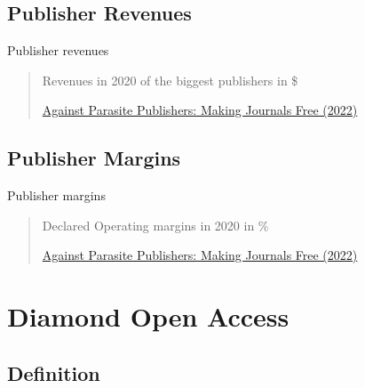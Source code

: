 \documentclass[10pt,compress,serif,aspectratio=169]{beamer}
\begin{document}

\subsection{Publisher Revenues}
\begin{frame}[t]{Publisher revenues}
 \begin{quote}
   Revenues in 2020 of the biggest publishers in \$

   \href{https://doi.org/10.5281/zenodo.7212922}{Against Parasite Publishers: Making Journals Free (2022)}

 \end{quote}
\end{frame}

\subsection{Publisher Margins}
\begin{frame}[t]{Publisher margins}
 \begin{quote}

   Declared Operating margins in 2020 in \%

   \href{https://doi.org/10.5281/zenodo.7212922}{Against Parasite Publishers: Making Journals Free (2022)}


\end{quote}
\end{frame}


\section{Diamond Open Access}
\subsection{Definition}
\end{document}
